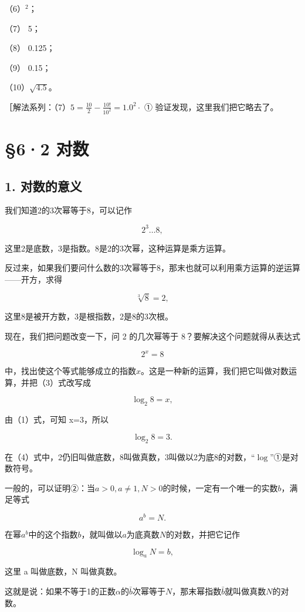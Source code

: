 （6）\(^{2}\)；

（7） 5；

（8） 0.125；

（9） 0.15；

（10）\(\sqrt{4.5}\)。

［解法系列：（7）\(5 = \frac{10}{2} -\frac{10!}{10^{2}} = 1.0^{2}\cdot\)
① 验证发现，这里我们把它略去了。

\section{§6·2 对数}

\subsection{1. 对数的意义}

我们知道2的3次幂等于8，可以记作

\[
2^{3} \dots 8, \tag {1}
\]

这里2是底数，3是指数。8是2的3次幂，这种运算是乘方运算。

反过来，如果我们要问什么数的3次幂等于8，那末也就可以利用乘方运算的逆运算------开方，求得

\[
\sqrt[3]{8} = 2, \tag {2}
\]

这里8是被开方数，3是根指数，2是8的3次根。

现在，我们把问题改变一下，问 2 的几次幂等于
8？要解决这个问题就得从表达式

\[
2^{x} = 8 \tag {3}
\]

中，找出使这个等式能够成立的指数\(x\)。这是一种新的运算，我们把它叫做对数运算，并把（3）式改写成

\[
\log_{2} 8 = x,
\]

由（1）式，可知 x=3，所以

\[
\log_{2} 8 = 3. \tag {4}
\]

在（4）式中，2仍旧叫做底数，8叫做真数，3叫做以2为底8的对数，``\(\log\)''①是对数符号。

一般的，可以证明②：当\(a > 0, a \neq 1, N > 0\)的时候，一定有一个唯一的实数\(b\)，满足等式

\[
a^{b} = N.
\]

在幂\(a^b\)中的这个指数\(b\)，就叫做以\(a\)为底真数\(N\)的对数，并把它记作

\[
\log_{a} N = b,
\]

这里 a 叫做底数，N 叫做真数。

这就是说：如果不等于1的正数\(\alpha\)的\(\bar{b}\)次幂等于\(N\)，那末幂指数\(\bar{b}\)就叫做真数\(N\)的对数。


